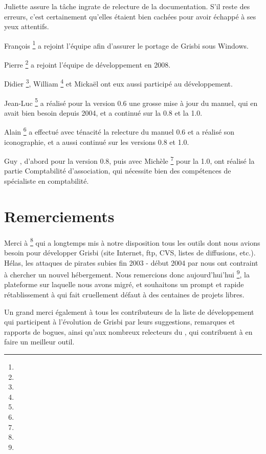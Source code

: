 Juliette  assure la tâche ingrate de relecture de la documentation. S'il reste des erreurs, c'est certainement qu'elles étaient bien cachées pour avoir échappé à ses yeux attentifs.

François \footnote{\urlFrancoisTerrotEmail{}} a rejoint l'équipe afin d'assurer le \gls{portage} de Grisbi sous Windows.

Pierre \footnote{\urlPierreBiavaEmail{}} a rejoint l'équipe de développement en 2008.

Didier \footnote{\urlDidierChevalierEmail{}}, William \footnote{\urlWilliamOllivierEmail{}} et Mickaël  ont eux aussi participé au développement.

Jean-Luc \footnote{\urlJeanLucDuflotEmail{}} a réalisé pour la version 0.6 une grosse mise à jour du manuel, qui en avait bien besoin depuis 2004, et a continué sur la 0.8 et la 1.0.

Alain \footnote{\urlAlainLetientEmail{}} a effectué avec ténacité la relecture du manuel 0.6 et a réalisé son iconographie, et a aussi continué sur les versions 0.8 et 1.0.

Guy , d'abord pour la version 0.8, puis avec Michèle \footnote{\urlMicheleBondilEmail{}} pour la 1.0, ont réalisé la partie Comptabilité d'association, qui nécessite bien des compétences de spécialiste en comptabilité.


\section{Remerciements\label{introduction-thanks}}


Merci à \footnote{\urlTuxFamily{}} qui a longtemps mis à notre disposition tous les outils dont nous avions besoin pour développer Grisbi (site Internet, ftp, CVS, listes de diffusions, etc.). Hélas, les attaques de pirates subies fin 2003 - début 2004 par  nous ont contraint à chercher un nouvel hébergement. Nous remercions donc aujourd'hui'hui \footnote{\urlSourceForge{}}, la plateforme sur laquelle nous avons migré, et souhaitons un prompt et rapide rétablissement à  qui fait cruellement défaut à des centaines de projets libres.

Un grand merci également à tous les contributeurs de la liste de développement qui participent à l'évolution de Grisbi par leurs suggestions, remarques et rapports de bogues, ainsi qu'aux nombreux relecteurs du , qui contribuent à en faire un meilleur outil.


